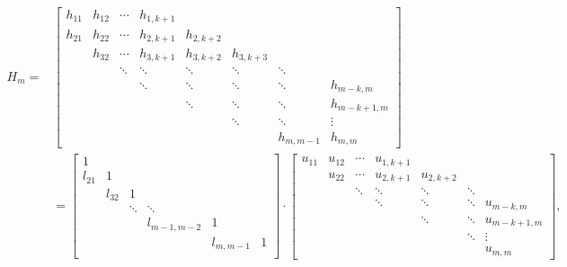 \documentclass[a4paper,10pt]{ctexart}
\begin{document}
\begin{tiny}
\[
    \begin{aligned}
        H_m = &
    \begin{bmatrix} 
        h_{11} & h_{12} &\cdots & h_{1,k+1} & & &\\
        h_{21} & h_{22} &\cdots & h_{2,k+1} & h_{2,k+2} & &\\
        & h_{32} &\cdots & h_{3,k+1} & h_{3,k+2} & h_{3,k+3} &\\
        & & \ddots & \ddots & \ddots & \ddots & \ddots\\
        & & & \ddots & \ddots & \ddots & \ddots & h_{m-k,m}\\
        & & & & \ddots & \ddots & \ddots & h_{m-k+1,m}\\
        & & & & & \ddots & \ddots & \vdots \\
        & & & & & & h_{m,m-1} & h_{m,m}
    \end{bmatrix} \\
    &= \begin{bmatrix} 
        1 & & & & &\\
        l_{21} & 1 & & & &\\
        & l_{32} & 1 & & &\\
        & & \ddots & \ddots & &\\
        & & & l_{m-1,m-2} & 1 &\\
        & & & & l_{m,m-1} & 1\\
    \end{bmatrix}\cdot 
    \begin{bmatrix} 
        u_{11} & u_{12} &\cdots & u_{1,k+1} & & &\\
        & u_{22} &\cdots & u_{2,k+1} & u_{2,k+2} & &\\
        & & \ddots & \ddots & \ddots & \ddots &\\
        & & & \ddots & \ddots & \ddots & u_{m-k,m}\\
        & & & & \ddots & \ddots & u_{m-k+1,m}\\
        & & & & & \ddots & \vdots\\
        & & & & & & u_{m,m}
    \end{bmatrix},
    \end{aligned}
\]
\end{tiny}
\end{document}
